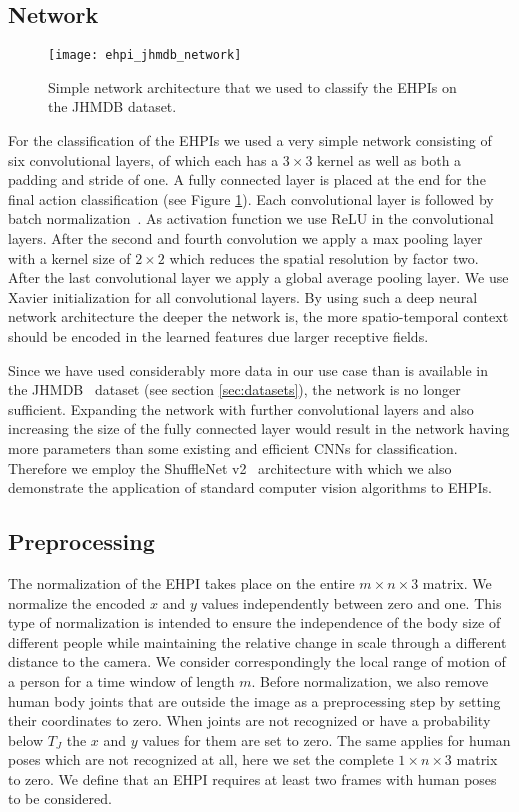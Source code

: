 \documentclass[a4paper, 10pt, conference]{ieeeconf}
\begin{document}
\subsection{Network}
\begin{figure}
  \centering
  \texttt{[image: ehpi\_jhmdb\_network]}
  \caption{Simple network architecture that we used to classify the EHPIs on the JHMDB dataset.}
  \label{fig:ehpi_jhmdb_network}
\end{figure}
For the classification of the EHPIs we used a very simple network consisting of six convolutional layers, of which each has a $3\times 3$ kernel as well as both a padding and stride of one. A fully connected layer is placed at the end for the final action classification (see Figure \ref{fig:ehpi_jhmdb_network}). Each convolutional layer is followed by batch normalization~\cite{ioffeBatchNormalizationAccelerating2015}. As activation function we use ReLU in the convolutional layers. After the second and fourth convolution we apply a max pooling layer with a kernel size of $2\times 2$ which reduces the spatial resolution by factor two. After the last convolutional layer we apply a global average pooling layer. We use Xavier initialization \cite{glorotUnderstandingDifficultyTraining2010} for all convolutional layers. By using such a deep neural network architecture the deeper the network is, the more spatio-temporal context should be encoded in the learned features due larger receptive fields.

Since we have used considerably more data in our use case than is available in the JHMDB~\cite{jhuangUnderstandingActionRecognition2013} dataset (see section \ref{sec:datasets}), the network is no longer sufficient. Expanding the network with further convolutional layers and also increasing the size of the fully connected layer would result in the network having more parameters than some existing and efficient CNNs for classification. Therefore we employ the ShuffleNet v2~\cite{maShuffleNetV2Practical2018} architecture with which we also demonstrate the application of standard computer vision algorithms to EHPIs.

\subsection{Preprocessing}
\label{subsec:preprocessing}
The normalization of the EHPI takes place on the entire $m\times n\times3$ matrix. We normalize the encoded $x$ and $y$ values independently between zero and one. This type of normalization is intended to ensure the independence of the body size of different people while maintaining the relative change in scale through a different distance to the camera. We consider correspondingly the local range of motion of a person for a time window of length $m$. Before normalization, we also remove human body joints that are outside the image as a preprocessing step by setting their coordinates to zero. When joints are not recognized or have a probability below $T_J$ the $x$ and $y$ values for them are set to zero. The same applies for human poses which are not recognized at all, here we set the complete $1\times n\times3$ matrix to zero. We define that an EHPI requires at least two frames with human poses to be considered.
\end{document}
